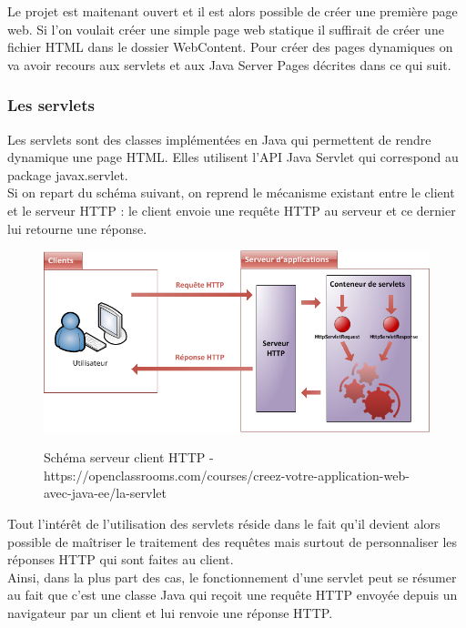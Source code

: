 Le projet est maitenant ouvert et il est alors possible de créer une première page web. Si l'on voulait créer une simple page web statique il suffirait de créer une fichier HTML dans le dossier WebContent. Pour créer des pages dynamiques on va avoir recours aux servlets et aux Java Server Pages décrites dans ce qui suit.


\subsubsection{Les servlets}
Les servlets sont des classes implémentées en Java qui permettent de rendre
dynamique une page HTML. Elles utilisent l'API Java Servlet qui correspond au
package javax.servlet.\\

Si on repart du schéma suivant, on reprend le mécanisme existant entre le client
et le serveur HTTP : le client envoie une requête HTTP au serveur et ce dernier
lui retourne une réponse.\\
\begin{figure}[H]
  \center
  \includegraphics[scale=0.5]{../graph/serveurclient.png} \\
  \caption{Schéma serveur client HTTP - https://openclassrooms.com/courses/creez-votre-application-web-avec-java-ee/la-servlet}
\end{figure}

Tout l'intérêt de l'utilisation des servlets réside dans le fait qu'il devient
alors possible de maîtriser le traitement des requêtes mais surtout de personnaliser
les réponses HTTP qui sont faites au client.\\

Ainsi, dans la plus part des cas, le fonctionnement d'une servlet peut se résumer
au fait que c'est une classe Java qui reçoit une requête HTTP envoyée depuis un
navigateur par un client et lui renvoie une réponse HTTP.\\

